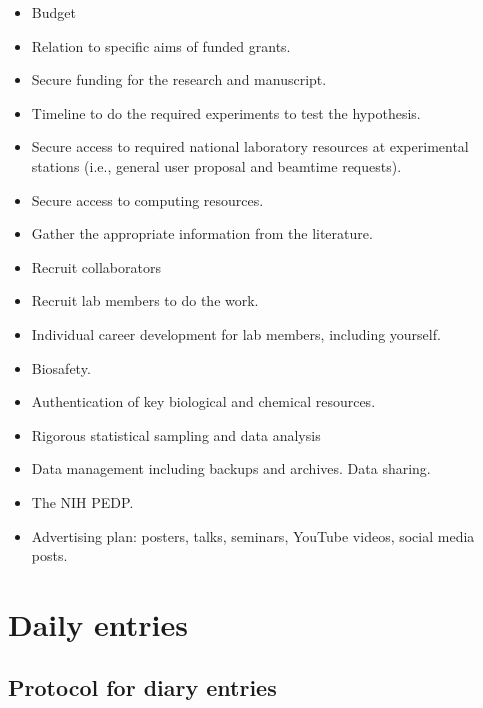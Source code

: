 \documentclass[10pt,letterpaper]{article}
\begin{document}
\begin{itemize}
  \item Budget
  \item Relation to specific aims of funded grants.
  \item Secure funding for the research and manuscript.
  \item Timeline to do the required experiments to test the hypothesis. 
  \item Secure access to required national laboratory resources at experimental stations (i.e., general user proposal and beamtime requests).
  \item Secure access to computing resources.
  \item Gather the appropriate information from the literature.
  \item Recruit collaborators
  \item Recruit lab members to do the work.
  \item Individual career development for lab members, including yourself.
  \item Biosafety.
  \item Authentication of key biological and chemical resources.
  \item Rigorous statistical sampling and data analysis
  \item Data management including backups and archives.
  \itme Data sharing.
  \item The NIH PEDP.
  \item Advertising plan: posters, talks, seminars, YouTube videos, social media posts.
\end{itemize}






\section{Daily entries}
\label{sec:dailyEntries}

\subsection{Protocol for diary entries}
\label{sub:daily-protocol}
\end{document}
